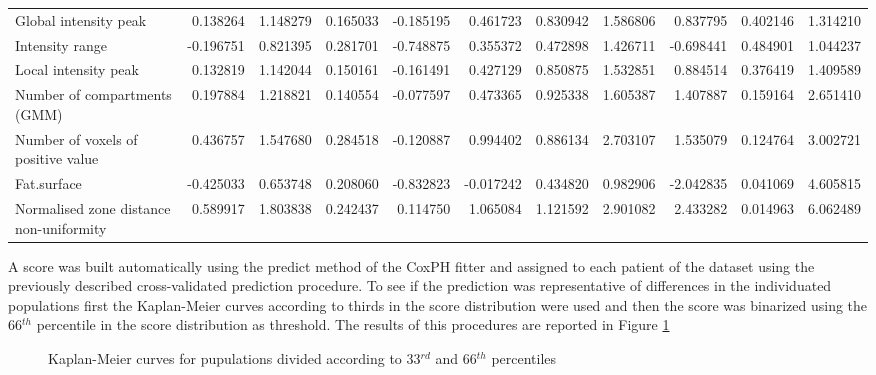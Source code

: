 \begin{table}
\begin{adjustbox}{width=0.7\paperheight, angle=90}
\begin{tabular}{|lrrrrrrrrrr|}
Global intensity peak                   &  0.138264 &   1.148279 &  0.165033 &       -0.185195 &        0.461723 &             0.830942 &             1.586806 &  0.837795 &  0.402146 &  1.314210 \\
Intensity range                         & -0.196751 &   0.821395 &  0.281701 &       -0.748875 &        0.355372 &             0.472898 &             1.426711 & -0.698441 &  0.484901 &  1.044237 \\
Local intensity peak                    &  0.132819 &   1.142044 &  0.150161 &       -0.161491 &        0.427129 &             0.850875 &             1.532851 &  0.884514 &  0.376419 &  1.409589 \\
Number of compartments (GMM)            &  0.197884 &   1.218821 &  0.140554 &       -0.077597 &        0.473365 &             0.925338 &             1.605387 &  1.407887 &  0.159164 &  2.651410 \\
Number of voxels of positive value      &  0.436757 &   1.547680 &  0.284518 &       -0.120887 &        0.994402 &             0.886134 &             2.703107 &  1.535079 &  0.124764 &  3.002721 \\
Fat.surface                             & -0.425033 &   0.653748 &  0.208060 &       -0.832823 &       -0.017242 &             0.434820 &             0.982906 & -2.042835 &  0.041069 &  4.605815 \\
Normalised zone distance non-uniformity &  0.589917 &   1.803838 &  0.242437 &        0.114750 &        1.065084 &             1.121592 &             2.901082 &  2.433282 &  0.014963 &  6.062489 \\
\bottomrule
\end{tabular}
\end{adjustbox}
\end{table}

A score was built automatically using the predict method of the CoxPH fitter and assigned to each patient of the dataset using the previously described cross-validated prediction procedure.
To see if the prediction was representative of differences in the individuated populations first the Kaplan-Meier curves according to thirds in the score distribution were used and then the score was binarized using the 66$^{th}$ percentile in the score distribution as threshold.
The results of this procedures are reported in Figure \ref{fig:KmCoxScore}


\begin{figure}[H]
\centering
	\newline
        \caption{Kaplan-Meier curves for pupulations divided according to 33$^{rd}$ and 66$^{th}$ percentiles }\label{fig:KmCoxScore}
\end{figure}

